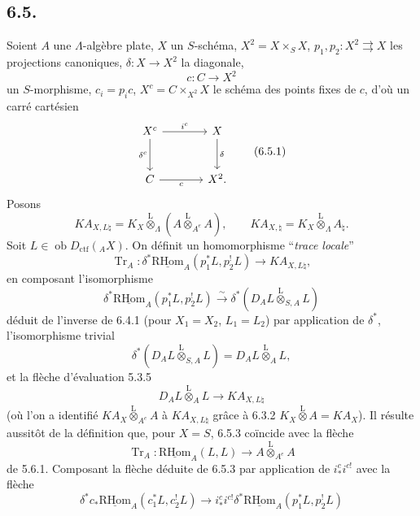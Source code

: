 \documentclass[11pt]{article}
\newcommand{\R}{\mathrm{R}}\newcommand{\RHomCore}{\mathrm{RHom}}
\providecommand{\RHom}{\RHomCore}
\providecommand{\uRHom}{\underline{\RHom}}
\providecommand{\Tr}{\operatorname{Tr}}
\providecommand{\Tr}{\operatorname{Tr}}
\providecommand{\lten}{\overset{\mathrm L}{\otimes}}
\providecommand{\Ob}{\operatorname{ob}}
\providecommand{\Tr}{\operatorname{Tr}}
\providecommand{\RHom}{\RHomCore}
\providecommand{\lten}{\overset{\mathrm L}{\otimes}}
\providecommand{\RHom}{\R\mathcal{H}om}
\providecommand{\lten}{\overset{\mathrm L}{\otimes}}
\providecommand{\Ob}{\operatorname{ob}}
\providecommand{\R}{\mathrm R}
\providecommand{\Tr}{\operatorname{Tr}}
\providecommand{\lten}{\overset{\mathrm L}{\otimes}}
\providecommand{\lten}{\overset{\mathrm L}{\otimes}}
\providecommand{\Ob}{\operatorname{Ob}}
\providecommand{\lten}{\overset{\mathrm L}{\otimes}}
\providecommand{\RHom}{\RHomCore}
\providecommand{\Tr}{\operatorname{Tr}}
\providecommand{\Ob}{\operatorname{ob}}
\providecommand{\Ob}{\operatorname{Ob}}
\providecommand{\lten}{\overset{\mathrm L}{\otimes}}
\begin{document}
\subsection*{6.5.}
Soient $A$ une $\Lambda$-algèbre plate, $X$ un $S$-schéma, $X^2=X\times_SX$, $p_1,p_2:X^2\rightrightarrows X$ les projections canoniques, $\delta:X\to X^2$ la diagonale,
\[
c:C\longrightarrow X^2
\]
un $S$-morphisme, $c_i=p_ic$, $X^c=C\times_{X^2}X$ le schéma des points fixes de $c$, d'où un carré cartésien
\begin{equation}
\begin{tikzcd}[column sep=large,row sep=large]
X^c \arrow[r,"i^c"] \arrow[d,"\delta^c"'] & X \arrow[d,"\delta"]\\
C \arrow[r,"c"'] & X^2 .
\end{tikzcd}
\tag{6.5.1}
\end{equation}
Posons
\begin{equation}
KA_{X,L\natural}=K_X\lten_{\Lambda}(A\lten_{A^e}A),
\qquad
KA_{X,\natural}=K_X\lten_{\Lambda}A_{\natural}.
\tag{6.5.2}
\end{equation}
Soit $L\in\Ob D_{\mathrm{ctf}}({}_AX)$. On définit un homomorphisme ``\emph{trace locale}''
\begin{equation}
\Tr_A:\delta^*\uRHom_A(p_1^*L,p_2^!L)
\longrightarrow
KA_{X,L\natural},
\tag{6.5.3}
\end{equation}
en composant l'isomorphisme
\begin{equation}
\delta^*\uRHom_A(p_1^*L,p_2^!L)
\xrightarrow{\sim}
\delta^*(D_AL\lten_{S,A}L)
\tag{6.5.4}
\end{equation}
déduit de l'inverse de 6.4.1 (pour $X_1=X_2$, $L_1=L_2$) par application de $\delta^*$, l'isomorphisme trivial
\begin{equation}
\delta^*(D_AL\lten_{S,A}L)=D_AL\lten_AL,
\tag{6.5.5}
\end{equation}
et la flèche d'évaluation 5.3.5
\begin{equation}
D_AL\lten_AL\longrightarrow KA_{X,L\natural}
\tag{6.5.6}
\end{equation}
(où l'on a identifié $KA_X\lten_{A^e}A$ à $KA_{X,L\natural}$ grâce à 6.3.2 $K_X\lten A=KA_X$). Il résulte aussitôt de la définition que, pour $X=S$, 6.5.3 coïncide avec la flèche
\[
\Tr_A:\uRHom_A(L,L)\longrightarrow A\lten_{A^e}A
\]
de 5.6.1. Composant la flèche déduite de 6.5.3 par application de $i_*^ci^{c!}$ avec la flèche
\begin{equation}
\delta^*c_*\uRHom_A(c_1^*L,c_2^!L)
\longrightarrow
i_*^ci^{c!}\delta^*\uRHom_A(p_1^*L,p_2^!L)
\tag{6.5.7}
\end{equation}
\end{document}
